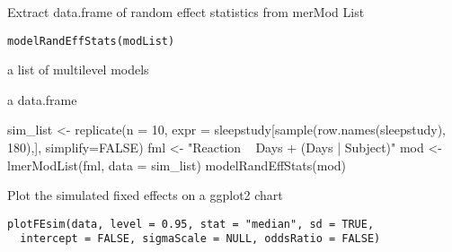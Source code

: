\documentclass[letterpaper]{book}
\begin{document}
%
\begin{Description}\relax
Extract data.frame of random effect statistics from merMod List
\end{Description}
%
\begin{Usage}
\begin{verbatim}
modelRandEffStats(modList)
\end{verbatim}
\end{Usage}
%
\begin{Arguments}
\begin{ldescription}
\item[\code{modList}] a list of multilevel models
\end{ldescription}
\end{Arguments}
%
\begin{Value}
a data.frame
\end{Value}
%
\begin{Examples}
\begin{ExampleCode}
sim_list <- replicate(n = 10,
        expr = sleepstudy[sample(row.names(sleepstudy), 180),],
        simplify=FALSE)
fml <- "Reaction ~ Days + (Days | Subject)"
mod <- lmerModList(fml, data = sim_list)
modelRandEffStats(mod)
\end{ExampleCode}
\end{Examples}
%
\begin{Description}\relax
Plot the simulated fixed effects on a ggplot2 chart
\end{Description}
%
\begin{Usage}
\begin{verbatim}
plotFEsim(data, level = 0.95, stat = "median", sd = TRUE,
  intercept = FALSE, sigmaScale = NULL, oddsRatio = FALSE)
\end{verbatim}
\end{Usage}
%
\end{document}
